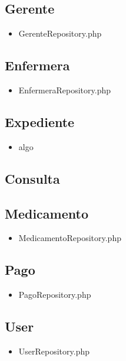 		\subsection{Gerente}
		\begin{itemize}
			\item GerenteRepository.php
		\end{itemize}
		\subsection{Enfermera}
		\begin{itemize}
			\item EnfermeraRepository.php
		\end{itemize}
		\subsection{Expediente}
		\begin{itemize}
			\item algo
		\end{itemize}
		\subsection{Consulta}
		
		\subsection{Medicamento}
		\begin{itemize}
		\item MedicamentoRepository.php
		\end{itemize}
		\subsection{Pago}
		\begin{itemize}
			\item PagoRepository.php
		\end{itemize}
		\subsection{User}
		\begin{itemize}
			\item UserRepository.php
		\end{itemize}%


